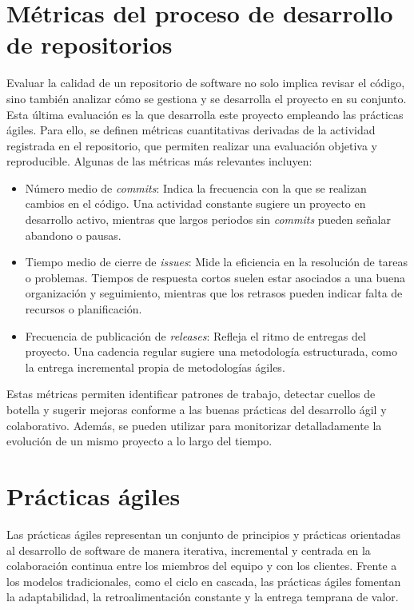 \section{Métricas del proceso de desarrollo de repositorios}
Evaluar la calidad de un repositorio de software no solo implica revisar el código, sino también analizar cómo se gestiona y se desarrolla el proyecto en su conjunto. Esta última evaluación es la que desarrolla este proyecto empleando las prácticas ágiles. Para ello, se definen métricas cuantitativas derivadas de la actividad registrada en el repositorio, que permiten realizar una evaluación objetiva y reproducible. Algunas de las métricas más relevantes incluyen:

\begin{itemize}
\item Número medio de \textit{commits}: Indica la frecuencia con la que se realizan cambios en el código. Una actividad constante sugiere un proyecto en desarrollo activo, mientras que largos periodos sin \textit{commits} pueden señalar abandono o pausas.
\item Tiempo medio de cierre de \textit{issues}: Mide la eficiencia en la resolución de tareas o problemas. Tiempos de respuesta cortos suelen estar asociados a una buena organización y seguimiento, mientras que los retrasos pueden indicar falta de recursos o planificación.
\item Frecuencia de publicación de \textit{releases}: Refleja el ritmo de entregas del proyecto. Una cadencia regular sugiere una metodología estructurada, como la entrega incremental propia de metodologías ágiles.
\end{itemize}

Estas métricas permiten identificar patrones de trabajo, detectar cuellos de botella y sugerir mejoras conforme a las buenas prácticas del desarrollo ágil y colaborativo. Además, se pueden utilizar para monitorizar detalladamente la evolución de un mismo proyecto a lo largo del tiempo.

\section{Prácticas ágiles}
Las prácticas ágiles representan un conjunto de principios y prácticas orientadas al desarrollo de software de manera iterativa, incremental y centrada en la colaboración continua entre los miembros del equipo y con los clientes. Frente a los modelos tradicionales, como el ciclo en cascada, las prácticas ágiles fomentan la adaptabilidad, la retroalimentación constante y la entrega temprana de valor.


